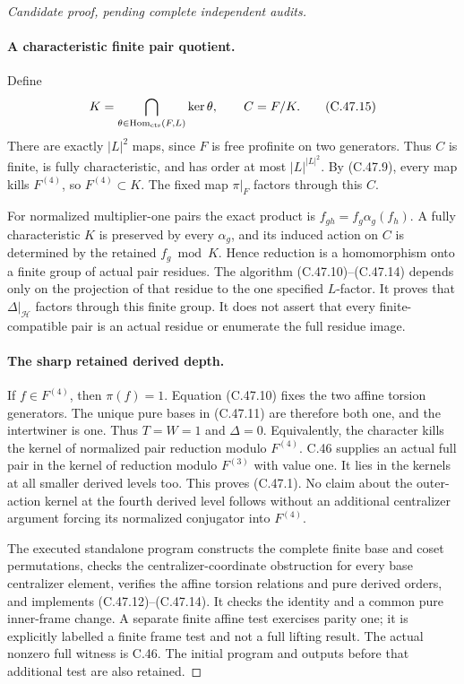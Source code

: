 \begin{proof}[Candidate proof, pending complete independent audits]
\paragraph{A characteristic finite pair quotient.}
Define
\[
 K=\bigcap_{\theta\in\operatorname{Hom}_{\rm cts}(F,L)}\ker\theta,
                       \qquad C=F/K.                \tag{C.47.15}
\]
There are exactly $|L|^2$ maps, since $F$ is free profinite on
two generators. Thus $C$ is finite, is fully characteristic,
and has order at most $|L|^{|L|^2}$. By (C.47.9), every map
kills $F^{(4)}$, so $F^{(4)}\subset K$. The fixed map
$\pi|_F$ factors through this $C$.

For normalized multiplier-one pairs the exact product is
$f_{gh}=f_g\alpha_g(f_h)$. A fully characteristic $K$ is
preserved by every $\alpha_g$, and its induced action on $C$
is determined by the retained $f_g\bmod K$. Hence reduction
is a homomorphism onto a finite group of actual pair residues.
The algorithm (C.47.10)--(C.47.14) depends only on the projection
of that residue to the one specified $L$-factor. It proves that
$\Delta|_{\mathcal H}$ factors through this finite group.
It does not assert that every finite-compatible pair is an
actual residue or enumerate the full residue image.

\paragraph{The sharp retained derived depth.}
If $f\in F^{(4)}$, then $\pi(f)=1$. Equation (C.47.10)
fixes the two affine torsion generators. The unique pure bases
in (C.47.11) are therefore both one, and the intertwiner is one.
Thus $T=W=1$ and $\Delta=0$. Equivalently, the character kills
the kernel of normalized pair reduction modulo $F^{(4)}$.
C.46 supplies an actual full pair in the kernel of reduction
modulo $F^{(3)}$ with value one. It lies in the kernels at all
smaller derived levels too. This proves (C.47.1).
No claim about the outer-action kernel at the fourth derived
level follows without an additional centralizer argument forcing
its normalized conjugator into $F^{(4)}$.

The executed standalone program
constructs the complete finite base and coset permutations,
checks the centralizer-coordinate obstruction for every base
centralizer element, verifies the affine torsion relations and
pure derived orders, and implements (C.47.12)--(C.47.14).
It checks the identity and a common pure inner-frame change.
A separate finite affine test exercises parity one; it is explicitly
labelled a finite frame test and not a full lifting result.
The actual nonzero full witness is C.46. The initial program and
outputs before that additional test are also retained.
\end{proof}
